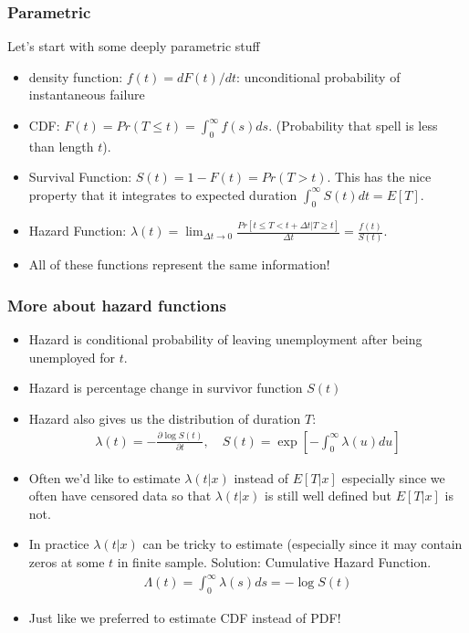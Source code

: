 \documentclass[aspectratio=169]{beamer}
\begin{document}
\begin{frame}
\frametitle{Parametric}
Let's start with some deeply parametric stuff
\begin{itemize}
\item density function: $f(t) = d F(t) / dt$: unconditional probability of instantaneous failure
\item CDF: $F(t) = Pr(T \leq t) = \int_0^{\infty} f(s) d s$. (Probability that spell is less than length $t$).
\item Survival Function: $S(t) = 1- F(t) = Pr( T > t)$. This has the nice property that it integrates to expected duration $\int_0^{\infty} S(t) d t = E[T]$.
\item Hazard Function: $\lambda(t)  = \lim_{\Delta t \rightarrow 0} \frac{Pr[t \leq T < t+ \Delta t | T \geq t]}{\Delta t} = \frac{f(t)}{S(t)}$.
\item \alert{All of these functions represent the same information!}
\end{itemize}
\end{frame}

\begin{frame}
\frametitle{More about hazard functions}
\small
\begin{itemize}
\item Hazard is conditional probability of leaving unemployment after being unemployed for $t$.
\item Hazard is percentage change in survivor function $S(t)$
\item Hazard also gives us the distribution of duration $T$:
\begin{eqnarray*}
\lambda(t) = - \frac{\partial \log S(t)}{\partial t}, \quad
S(t) = \exp \left[ - \int_0^{\infty} \lambda(u) d u \right]
\end{eqnarray*}
\item Often we'd like to estimate $\lambda(t | x)$ instead of $E[T | x]$ especially since we often have \alert{censored} data so that  $\lambda(t | x)$ is still well defined but $E[T | x]$ is not.
\item In practice  $\lambda(t | x)$ can be tricky to estimate (especially since it may contain zeros at some $t$ in finite sample. Solution: \alert{Cumulative Hazard Function}.
\begin{eqnarray*}
\Lambda(t) = \int_0^{\infty} \lambda(s) d s = - \log S(t)
\end{eqnarray*}
\item Just like we preferred to estimate CDF instead of PDF!
\end{itemize}
\end{frame}
\end{document}
